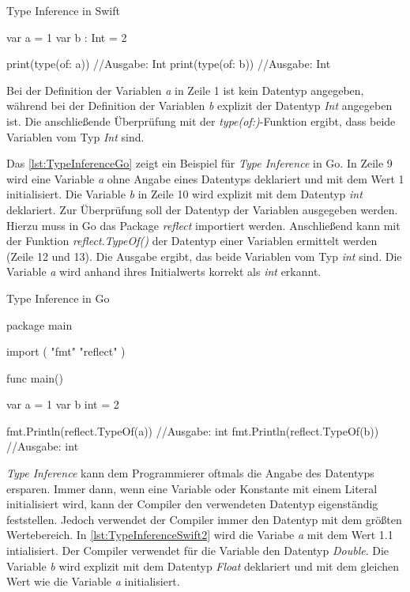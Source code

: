\begin{listing}
\caption{Type Inference in Swift}
\label{lst:TypeInferenceSwift}
\begin{SwiftCode}
var a = 1
var b : Int = 2

print(type(of: a)) //Ausgabe: Int
print(type(of: b)) //Ausgabe: Int
\end{SwiftCode}
\end{listing}

Bei der Definition der Variablen \emph{a} in Zeile 1 ist kein Datentyp angegeben, während bei der Definition der Variablen \emph{b} explizit der Datentyp \emph{Int} angegeben ist.
Die anschließende Überprüfung mit der \emph{type(of:)}-Funktion ergibt, dass beide Variablen vom Typ \emph{Int} sind.

Das \autoref{lst:TypeInferenceGo} zeigt ein Beispiel für \emph{Type Inference} in Go. 
In Zeile 9 wird eine Variable \emph{a} ohne Angabe eines Datentyps deklariert und mit dem Wert 1 initialisiert.
Die Variable \emph{b} in Zeile 10 wird explizit mit dem Datentyp \emph{int} deklariert.
Zur Überprüfung soll der Datentyp der Variablen ausgegeben werden. 
Hierzu muss in Go das Package \emph{reflect} importiert werden. 
Anschließend kann mit der Funktion \emph{reflect.TypeOf()} der Datentyp einer Variablen ermittelt werden (Zeile 12 und 13).
Die Ausgabe ergibt, das beide Variablen vom Typ \emph{int} sind. 
Die Variable \emph{a} wird anhand ihres Initialwerts korrekt als \emph{int} erkannt. 

\begin{listing}
\caption{Type Inference in Go }
\label{lst:TypeInferenceGo}
\begin{GoCode}
package main

import (
    "fmt"
    "reflect"
)

func main() {
    var a = 1
    var b int = 2
	
    fmt.Println(reflect.TypeOf(a)) //Ausgabe: int
    fmt.Println(reflect.TypeOf(b)) //Ausgabe: int
}
\end{GoCode}
\end{listing}

\emph{Type Inference} kann dem Programmierer oftmals die Angabe des Datentyps ersparen. 
Immer dann, wenn eine Variable oder Konstante mit einem \Gls{Literal} initialisiert wird, kann der Compiler den verwendeten Datentyp eigenständig feststellen. 
Jedoch verwendet der Compiler immer den Datentyp mit dem größten Wertebereich.
In \autoref{lst:TypeInferenceSwift2} wird die Variabe \emph{a} mit dem Wert 1.1 intialisiert.
Der Compiler verwendet für die Variable den Datentyp \emph{Double}.
Die Variable \emph{b} wird explizit mit dem Datentyp \emph{Float} deklariert und mit dem gleichen Wert wie die Variable \emph{a} initialisiert.

